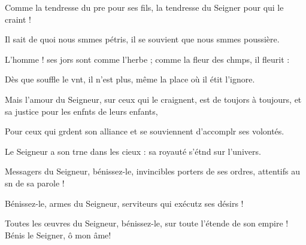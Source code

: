 \item Comme la tendresse du pre pour ses fils,\psstar{} la tendresse du Seigner pour qui le craint !
\item Il sait de quoi nous smmes pétris,\psstar{} il se souvient que nous smmes poussière.
\item L’homme ! ses jors sont comme l’herbe ;\psstar{} comme la fleur des chmps, il fleurit :
\item Dès que souffle le vnt, il n’est plus,\psstar{} même la place où il étit l’ignore.
\item Mais l’amour du Seigneur, sur ceux qui le craignent,\pscross{} est de toujors à toujours,\psstar{} et sa justice pour les enfnts de leurs enfants,
\item Pour ceux qui grdent son alliance\psstar{} et se souviennent d’accomplr ses volontés.
\item Le Seigneur a son trne dans les cieux :\psstar{} sa royauté s’étnd sur l’univers.
\item Messagers du Seigneur, bénissez-le, invincibles porters de ses ordres,\psstar{} attentifs au sn de sa parole !
\item Bénissez-le, armes du Seigneur,\psstar{} serviteurs qui exécutz ses désirs !
\item Toutes les œuvres du Seigneur, bénissez-le,\pscross{} sur toute l’étende de son empire !\psstar{} Bénis le Seigner, ô mon âme!